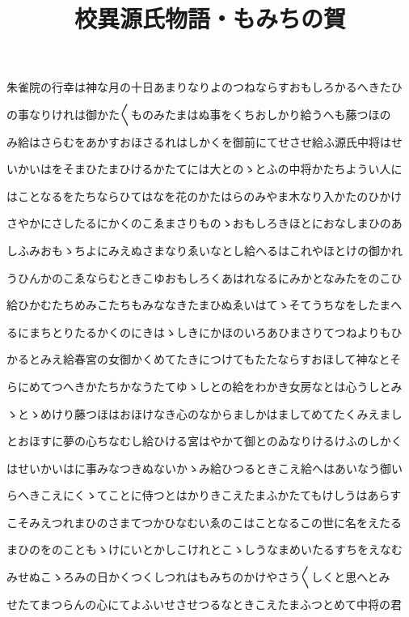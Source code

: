\documentclass[a4paper,11pt,landscape]{ltjtarticle}
\title{校異源氏物語・もみちの賀}
\date{}
\begin{document}
\maketitle

朱雀院の行幸は神な月の十日あまりなりよのつねならすおもしろかるへきたひ
\par\medskip
の事なりけれは御かた〱ものみたまはぬ事をくちおしかり給うへも藤つほの
\par\medskip
み給はさらむをあかすおほさるれはしかくを御前にてせさせ給ふ源氏中将はせ
\par\medskip
いかいはをそまひたまひけるかたてには大とのゝとふの中将かたちようい人に
\par\medskip
はことなるをたちならひてはなを花のかたはらのみやま木なり入かたのひかけ
\par\medskip
さやかにさしたるにかくのこゑまさりものゝおもしろきほとにおなしまひのあ
\par\medskip
しふみおもゝちよにみえぬさまなりゑいなとし給へるはこれやほとけの御かれ
\par\medskip
うひんかのこゑならむときこゆおもしろくあはれなるにみかとなみたをのこひ
\par\medskip
給ひかむたちめみこたちもみななきたまひぬゑいはてゝそてうちなをしたまへ
\par\medskip
るにまちとりたるかくのにきはゝしきにかほのいろあひまさりてつねよりもひ
\par\medskip
かるとみえ給春宮の女御かくめてたきにつけてもたたならすおほして神なとそ
\par\medskip
らにめてつへきかたちかなうたてゆゝしとの給をわかき女房なとは心うしとみ
\par\medskip
ゝとゝめけり藤つほはおほけなき心のなからましかはましてめてたくみえまし
\par\medskip
とおほすに夢の心ちなむし給ひける宮はやかて御とのゐなりけるけふのしかく
\par\medskip
はせいかいはに事みなつきぬないかゝみ給ひつるときこえ給へはあいなう御い
\par\medskip
らへきこえにくゝてことに侍つとはかりきこえたまふかたてもけしうはあらす
\par\medskip
こそみえつれまひのさまてつかひなむいゑのこはことなるこの世に名をえたる
\par\medskip
まひのをのこともゝけにいとかしこけれとこゝしうなまめいたるすちをえなむ
\par\medskip
みせぬこゝろみの日かくつくしつれはもみちのかけやさう〱しくと思へとみ
\par\medskip
せたてまつらんの心にてよふいせさせつるなときこえたまふつとめて中将の君
\end{document}
